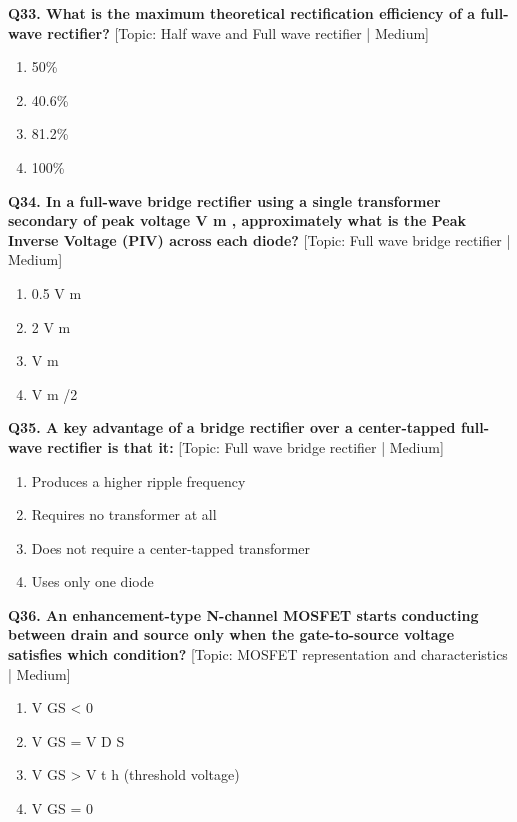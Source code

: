 \noindent\textbf{Q33. What is the maximum theoretical rectification efficiency of a full-wave rectifier?} \hfill [Topic: Half wave and Full wave rectifier | Medium]
\begin{enumerate}[label=(\alph*),topsep=2pt,itemsep=1pt,partopsep=0pt,parsep=0pt]
    \item {50\%}
    \item {40.6\%}
    \item {81.2\%}
    \item {100\%}
\end{enumerate}
\vspace{2mm}

\noindent\textbf{Q34. In a full-wave bridge rectifier using a single transformer secondary of peak voltage V m , approximately what is the Peak Inverse Voltage (PIV) across each diode?} \hfill [Topic: Full wave bridge rectifier | Medium]
\begin{enumerate}[label=(\alph*),topsep=2pt,itemsep=1pt,partopsep=0pt,parsep=0pt]
    \item {0.5 V m}
    \item {2 V m}
    \item {V m}
    \item {V m /2}
\end{enumerate}
\vspace{2mm}

\noindent\textbf{Q35. A key advantage of a bridge rectifier over a center-tapped full-wave rectifier is that it:} \hfill [Topic: Full wave bridge rectifier | Medium]
\begin{enumerate}[label=(\alph*),topsep=2pt,itemsep=1pt,partopsep=0pt,parsep=0pt]
    \item {Produces a higher ripple frequency}
    \item {Requires no transformer at all}
    \item {Does not require a center-tapped transformer}
    \item {Uses only one diode}
\end{enumerate}
\vspace{2mm}

\noindent\textbf{Q36. An enhancement-type N-channel MOSFET starts conducting between drain and source only when the gate-to-source voltage satisfies which condition?} \hfill [Topic: MOSFET representation and characteristics | Medium]
\begin{enumerate}[label=(\alph*),topsep=2pt,itemsep=1pt,partopsep=0pt,parsep=0pt]
    \item {V GS < 0}
    \item {V GS = V D S}
    \item {V GS > V t h (threshold voltage)}
    \item {V GS = 0}
\end{enumerate}
\vspace{2mm}

